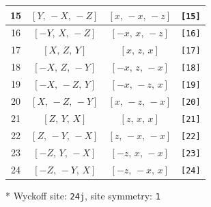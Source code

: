 \documentclass[fleqn,8pt]{jsarticle}
\begin{document}
\begin{longtable}{cccc}
15 & $\left[ Y,\, - X,\, - Z \right]$ & $\left[ x,\, - x,\, - z \right]$ & {\tt [15]} \\ \hline
16 & $\left[ - Y,\, X,\, - Z \right]$ & $\left[ - x,\, x,\, - z \right]$ & {\tt [16]} \\ \hline
17 & $\left[ X,\, Z,\, Y \right]$ & $\left[ x,\, z,\, x \right]$ & {\tt [17]} \\ \hline
18 & $\left[ - X,\, Z,\, - Y \right]$ & $\left[ - x,\, z,\, - x \right]$ & {\tt [18]} \\ \hline
19 & $\left[ - X,\, - Z,\, Y \right]$ & $\left[ - x,\, - z,\, x \right]$ & {\tt [19]} \\ \hline
20 & $\left[ X,\, - Z,\, - Y \right]$ & $\left[ x,\, - z,\, - x \right]$ & {\tt [20]} \\ \hline
21 & $\left[ Z,\, Y,\, X \right]$ & $\left[ z,\, x,\, x \right]$ & {\tt [21]} \\ \hline
22 & $\left[ Z,\, - Y,\, - X \right]$ & $\left[ z,\, - x,\, - x \right]$ & {\tt [22]} \\ \hline
23 & $\left[ - Z,\, Y,\, - X \right]$ & $\left[ - z,\, x,\, - x \right]$ & {\tt [23]} \\ \hline
24 & $\left[ - Z,\, - Y,\, X \right]$ & $\left[ - z,\, - x,\, x \right]$ & {\tt [24]} \\
\end{longtable}
* Wyckoff site: {\tt 24j}, site symmetry: {\tt 1}
\renewcommand{\arraystretch}{1.2}
\end{document}
